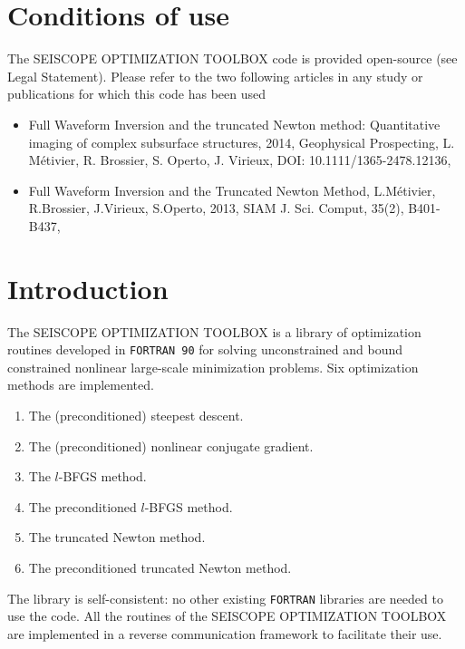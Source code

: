 \documentclass[a4paper,twoside,final,onecolumn,11pt,openright]{article}
\begin{document}
\newpage
\section*{Conditions of use}
 The SEISCOPE OPTIMIZATION TOOLBOX code is provided open-source (see Legal Statement). Please refer to the two following articles in any study or publications for which this code has been used
\begin{itemize}
 \item Full Waveform Inversion and the truncated Newton method: Quantitative imaging of complex subsurface structures, 2014, Geophysical Prospecting, L. M\'etivier, R. Brossier, S. Operto, J. Virieux, DOI: 10.1111/1365-2478.12136, \citet{Metivier_2013_GEP} 
 \item Full Waveform Inversion and the Truncated Newton Method, L.M\'etivier, R.Brossier, J.Virieux, S.Operto,  2013, SIAM J. Sci. Comput, 35(2), B401-B437, \citet{Metivier_2013_TRU}
\end{itemize}

\newpage
\setcounter{tocdepth}{2}
\tableofcontents

\newpage
\section{Introduction}
The SEISCOPE OPTIMIZATION TOOLBOX is a library of optimization routines developed in \texttt{FORTRAN 90} for solving unconstrained and bound constrained nonlinear large-scale minimization problems. Six optimization methods are implemented.
\begin{enumerate}
 \item The (preconditioned) steepest descent.
 \item The (preconditioned) nonlinear conjugate gradient.
 \item The $l$-BFGS method.
 \item The preconditioned $l$-BFGS method.
 \item The truncated Newton method.
 \item The preconditioned truncated Newton method.
\end{enumerate}
The library is self-consistent: no other existing \texttt{FORTRAN} libraries are needed to use the code. All the routines of the SEISCOPE OPTIMIZATION TOOLBOX are implemented in a reverse communication framework to facilitate their use. 
\end{document}
